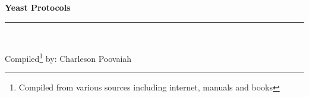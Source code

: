 \documentclass[a4paper,12pt]{article}
\newcommand{\protocol}{Yeast Protocols}
\newcommand{\labtitle}{}
\newcommand{\authorname}{Charleson Poovaiah}
\begin{document}
 
 
 
\begin{titlepage}
\begin{center}
{\LARGE \textbf{\protocol} \\ \vspace{4pt}}
\rule[13pt]{\textwidth}{1pt} \\ \vspace{150pt}
 
{\large Compiled\footnote{Compiled from various sources including internet, manuals and books} by: \authorname \\ \vspace{10pt}
}
\end{center}
\end{titlepage}
 
\newpage
\thispagestyle{empty}           %
\setcounter{tocdepth}{2}
\tableofcontents
\clearpage                      %
 
\setcounter{page}{1}






\printindex
\end{document}
